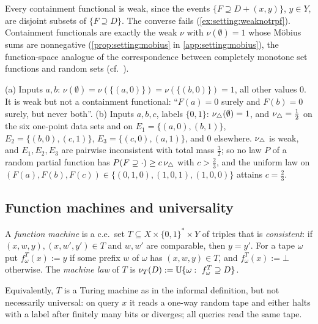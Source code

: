 Every containment functional is weak, since the events $\{F\supseteq D+(x,y)\}$, $y\in Y$, are disjoint subsets of $\{F\supseteq D\}$. The converse fails (\cref{ex:setting:weaknotrpf}). Containment functionals are exactly the weak $\nu$ with $\nu(\emptyset)=1$ whose Möbius sums are nonnegative (\cref{prop:setting:mobius} in \cref{app:setting:mobius}), the function-space analogue of the correspondence between completely monotone set functions and random sets (cf.\ \citealp{choquet1954theory,matheron1975random,shafer1976mathematical}).

\begin{example}\label{ex:setting:weaknotrpf}
(a) Inputs $a,b$: $\nu(\emptyset)=\nu(\{(a,0)\})=\nu(\{(b,0)\})=1$, all other values $0$. It is weak but not a containment functional: ``$F(a)=0$ surely and $F(b)=0$ surely, but never both''.
(b) Inputs $a,b,c$, labels $\{0,1\}$: $\nu_{\triangle}(\emptyset)=1$, and $\nu_{\triangle}=\frac12$ on the six one-point data sets and on $E_1=\{(a,0),(b,1)\}$, $E_2=\{(b,0),(c,1)\}$, $E_3=\{(c,0),(a,1)\}$, and $0$ elsewhere. $\nu_{\triangle}$ is weak, and $E_1,E_2,E_3$ are pairwise inconsistent with total mass $\frac32$; so no law $P$ of a random partial function has $P(F\supseteq\cdot)\ge c\,\nu_{\triangle}$ with $c>\frac23$, and the uniform law on $(F(a),F(b),F(c))\in\{(0,1,0),(1,0,1),(1,0,0)\}$ attains $c=\frac23$.
\end{example}

\subsection{Function machines and universality}\label{sec:setting:machines}

\begin{definition}\label{def:setting:machine}
A \emph{function machine} is a c.e.\ set $T\subseteq X\times\{0,1\}^*\times Y$ of triples that is \emph{consistent}: if $(x,w,y),(x,w',y')\in T$ and $w,w'$ are comparable, then $y=y'$. For a tape $\omega$ put $f^T_\omega(x):=y$ if some prefix $w$ of $\omega$ has $(x,w,y)\in T$, and $f^T_\omega(x):=\bot$ otherwise. The \emph{machine law} of $T$ is $\nu_T(D):=\Unif\{\omega:\ f^T_\omega\supseteq D\}$.
\end{definition}

Equivalently, $T$ is a Turing machine as in the informal definition, but not necessarily universal: on query $x$ it reads a one-way random tape and either halts with a label after finitely many bits or diverges; all queries read the same tape.

